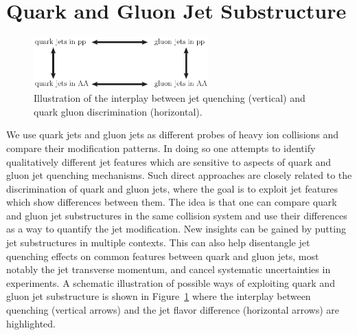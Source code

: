 \documentclass[notoc]{JHEP3}
\begin{document}
\section{Quark and Gluon Jet Substructure}
\label{sec:qg}
\begin{figure}[t]
	   \centering
	   \includegraphics[width=0.6\textwidth]{plots/qg_HI}
	   \caption{Illustration of the interplay between jet quenching (vertical) and quark gluon discrimination (horizontal). }
	   \label{fig:quenching_discrimination}
\end{figure}

We use quark jets and gluon jets as different probes of heavy ion collisions and compare their modification patterns. In doing so one attempts to identify qualitatively different jet features which are sensitive to aspects of quark and gluon jet quenching mechanisms. Such direct approaches are closely related to the discrimination of quark and gluon jets, where the goal is to exploit jet features which show differences between them. The idea is that one can compare quark and gluon jet substructures in the same collision system and use their differences as a way to quantify the jet modification. New insights can be gained by putting jet substructures in multiple contexts. This can also help disentangle jet quenching effects on common features between quark and gluon jets, most notably the jet transverse momentum, and cancel systematic uncertainties in experiments. A schematic illustration of possible ways of exploiting quark and gluon jet substructure is shown in Figure~\ref{fig:quenching_discrimination} where the interplay between quenching (vertical arrows) and the jet flavor difference (horizontal arrows) are highlighted.
\end{document}
